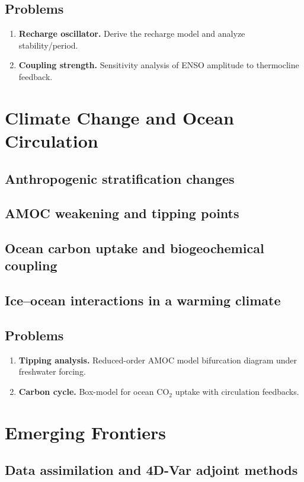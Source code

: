 \documentclass[12pt]{book}
\begin{document}
\section*{Problems}
\begin{enumerate}
  \item \textbf{Recharge oscillator.} Derive the recharge model and analyze stability/period.
  \item \textbf{Coupling strength.} Sensitivity analysis of ENSO amplitude to thermocline feedback.
\end{enumerate}

\chapter{Climate Change and Ocean Circulation}
\section{Anthropogenic stratification changes}
\section{AMOC weakening and tipping points}
\section{Ocean carbon uptake and biogeochemical coupling}
\section{Ice--ocean interactions in a warming climate}
\section*{Problems}
\begin{enumerate}
  \item \textbf{Tipping analysis.} Reduced-order AMOC model bifurcation diagram under freshwater forcing.
  \item \textbf{Carbon cycle.} Box-model for ocean CO$_2$ uptake with circulation feedbacks.
\end{enumerate}

\chapter{Emerging Frontiers}
\section{Data assimilation and 4D-Var adjoint methods}
\end{document}

